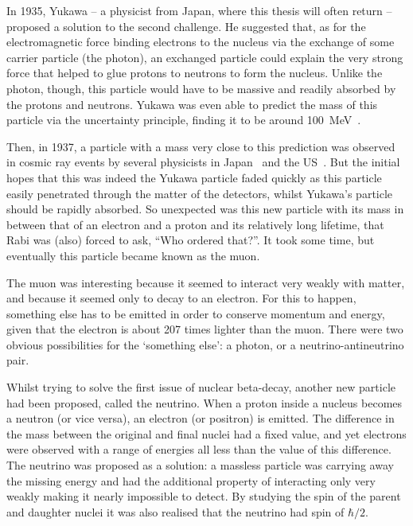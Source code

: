 In 1935, Yukawa -- a physicist from Japan, where this thesis will often return -- proposed a solution to the second challenge.
He suggested that, as for the electromagnetic force binding electrons to the nucleus via the exchange of some carrier particle (the photon), 
an exchanged particle could explain the very strong force that helped to glue protons to neutrons to form the nucleus.
Unlike the photon, though, this particle would have to be massive and readily absorbed by the protons and neutrons.
Yukawa was even able to predict the mass of this particle via the uncertainty principle, finding it to be around 100~MeV~\cite{Yukawa:1935xg}.

\FigTheoryMuonDecayCloudChamber
Then, in 1937, a particle with a mass very close to this prediction was observed in cosmic ray events by several physicists in Japan~\cite{Nishina193712} and the US~\cite{Neddermeyer1937md,Street193711}.
But the initial hopes that this was indeed the Yukawa particle faded quickly as this particle easily penetrated through the matter of the detectors, whilst Yukawa's particle should be rapidly absorbed.
So unexpected was this new particle with its mass in between that of an electron and a proton and its relatively long lifetime, that Rabi was (also) forced to ask, ``Who ordered that?''.
It took some time, but eventually this particle became known as the muon.

The muon was interesting because it seemed to interact very weakly with matter, and because it seemed only to decay to an electron.
For this to happen, something else has to be emitted in order to conserve momentum and energy, given that the electron is about 207 times lighter than the muon.
There were two obvious possibilities for the `something else': a photon, or a neutrino-antineutrino pair.

Whilst trying to solve the first issue of nuclear beta-decay, another new particle had been proposed, called the neutrino.
When a proton inside a nucleus becomes a neutron (or vice versa), an electron (or positron) is emitted.
The difference in the mass between the original and final nuclei had a fixed value, and yet electrons were observed with a range of energies all less than the value of this difference.
The neutrino was proposed as a solution: a massless particle was carrying away the missing energy and had the additional property of interacting only very weakly making it nearly impossible to detect.
By studying the spin of the parent and daughter nuclei it was also realised that the neutrino had spin of $\hbar/2$.

